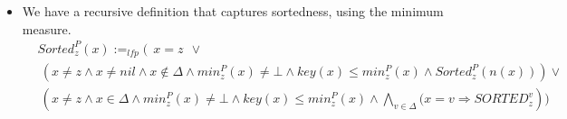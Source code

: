 \begin{itemize}
    \item We have a recursive definition that captures sortedness, using the minimum measure.
\begin{align*}
	&\textit{Sorted}_z^P(x) \!\!:=_{\textit{lfp}}\!\! \Big( ~~x\!\!=\!\textit{z} ~~\vee  \\
	&~\left( x \!\not =\! z \wedge x \!\not=\! nil \wedge x \not \in \Delta \wedge \textit{min}_z^P(x) \!\not =\! \bot \wedge \textit{key}(x) \leq \textit{min}_z^P(x) \wedge \textit{Sorted}_z^P(n(x))\right) \vee\\
&	~
\left(x \!\not =\! z \wedge x \in \Delta \wedge \textit{min}_z^P(x) \!\not =\! \bot \wedge \textit{key}(x) \leq \textit{min}_z^P(x) \wedge \bigwedge_{v \in \Delta} (x=v \Rightarrow \textit{SORTED}_z^v\right)\Big)
\end{align*}

\end{itemize}
